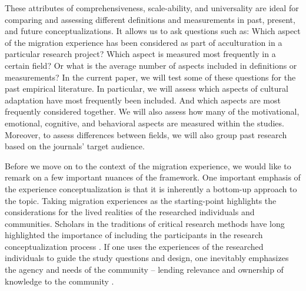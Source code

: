 \documentclass[man, 12pt, a4paper]{apa7}
\begin{document}
These attributes of comprehensiveness, scale-ability, and universality are ideal for comparing and assessing different definitions and measurements in past, present, and future conceptualizations. It allows us to ask questions such as: Which aspect of the migration experience has been considered as part of acculturation in a particular research project? Which aspect is measured most frequently in a certain field? Or what is the average number of aspects included in definitions or measurements? 
In the current paper, we will test some of these questions for the past empirical literature. In particular, we will assess which aspects of cultural adaptation have most frequently been included. And which aspects are most frequently considered together. We will also assess how many of the motivational, emotional, cognitive, and behavioral aspects are measured within the studies. Moreover, to assess differences between fields, we will also group past research based on the journals' target audience. 

Before we move on to the context of the migration experience, we would like to remark on a few important nuances of the framework. One important emphasis of the experience conceptualization is that it is inherently a bottom-up approach to the topic. Taking migration experiences as the starting-point highlights the considerations for the lived realities of the researched individuals and communities. Scholars in the traditions of critical research methods have long highlighted the importance of including the participants in the research conceptualization process \citep[e.g.,][]{Kovach2009}. If one uses the experiences of the researched individuals to guide the study questions and design, one inevitably emphasizes the agency and needs of the community -- lending relevance and ownership of knowledge to the community \citep[e.g., ][]{Schmidt2021}.
\end{document}
